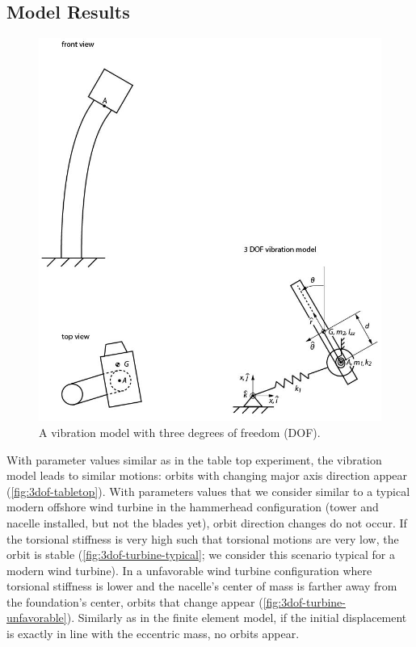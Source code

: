 \documentclass{article}
\begin{document}
\subsection{Model Results}

\begin{figure}
    \centering
    \includegraphics[scale=0.8]{figures/vibration_model.jpg}
    \caption{A vibration model with three degrees of freedom (DOF).}
    \label{fig:3dof-system}
\end{figure}

With parameter values similar as in the table top experiment, the vibration model leads to similar motions: orbits with changing major axis direction appear (\autoref{fig:3dof-tabletop}). With parameters values that we consider similar to a typical modern offshore wind turbine in the hammerhead configuration (tower and nacelle installed, but not the blades yet), orbit direction changes do not occur. If the torsional stiffness is very high such that torsional motions are very low, the orbit is stable (\autoref{fig:3dof-turbine-typical}; we consider this scenario typical for a modern wind turbine). In a unfavorable wind turbine configuration where torsional stiffness is lower and the nacelle's center of mass is farther away from the foundation's center, orbits that change appear (\autoref{fig:3dof-turbine-unfavorable}). Similarly as in the finite element model, if the initial displacement is exactly in line with the eccentric mass, no orbits appear.
\end{document}
